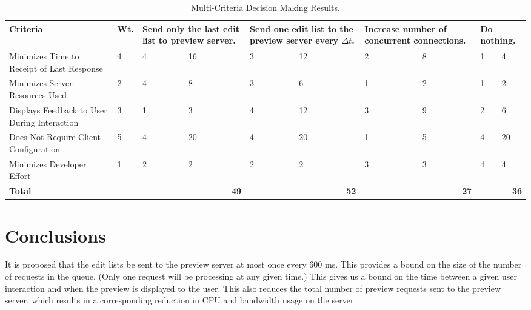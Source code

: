 \documentclass[se,resubmit]{uw-wkrpt}
\begin{document}
\begin{table}
  \caption{Multi-Criteria Decision Making Results.}
  \label{tbl:mcdm}
  \centering
  \begin{tabular}{|p{2.0cm}|p{1.0cm}|p{1.25cm}|p{1.25cm}|p{1.25cm}|p{1.25cm}|
                                     p{1.25cm}|p{1.25cm}|p{1.25cm}|p{1.25cm}|}
    \hline
    \textbf{Criteria} &
    \textbf{Wt.} &
    \multicolumn{2}{|p{2.5cm}|}{\textbf{Send only the last edit list to preview
    server.}} &
    \multicolumn{2}{|p{2.5cm}|}{\textbf{Send one edit list to the preview
    server every $\Delta t$.}} &
    \multicolumn{2}{|p{2.5cm}|}{\textbf{Increase number of concurrent
    connections.}} &
    \multicolumn{2}{|p{2.5cm}|}{\textbf{Do nothing.}} \\
    \hline\hline
    Minimizes Time to Receipt of Last Response &
       4 &  4 & 16 &  3 & 12 &  2 &  8 &  1 &  4 \\
    \hline
    Minimizes Server Resources Used &
       2 &  4 &  8 &  3 &  6 &  1 &  2 &  1 &  2 \\
    \hline
    Displays Feedback to User During Interaction &
       3 &  1 &  3 &  4 & 12 &  3 &  9 &  2 &  6 \\
    \hline
    Does Not Require Client Configuration &
       5 &  4 & 20 &  4 & 20 &  1 &  5 &  4 & 20 \\
    \hline
    Minimizes Developer Effort &
       1 &  2 &  2 &  2 &  2 &  3 &  3 &  4 &  4 \\
    \hline
    \hline
    \textbf{Total} &
      &
      \multicolumn{2}{|r|}{\textbf{49}} &
      \multicolumn{2}{|r|}{\textbf{52}} &
      \multicolumn{2}{|r|}{\textbf{27}} &
      \multicolumn{2}{|r|}{\textbf{36}} \\
    \hline
  \end{tabular}
\end{table}

\section{Conclusions}
It is proposed that the edit lists be sent to the preview server at most once
every 600 ms. This provides a bound on the size of the number of requests in the
queue. (Only one request will be processing at any given time.) This gives us a
bound on the time between a given user interaction and when the preview is
displayed to the user. This also reduces the total number of preview requests
sent to the preview server, which results in a corresponding reduction in CPU
and bandwidth usage on the server.
\end{document}
